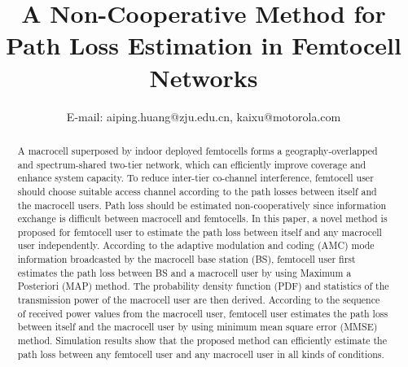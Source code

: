 \documentclass[conference]{IEEEtran}
\begin{document}
\title{A Non-Cooperative Method for Path Loss Estimation in Femtocell Networks}


\author{

 
E-mail: aiping.huang@zju.edu.cn, kaixu@motorola.com}












\maketitle


\begin{abstract}
A macrocell superposed by indoor deployed femtocells forms a
geography-overlapped and spectrum-shared two-tier network, which can
efficiently improve coverage and enhance system capacity. To reduce
inter-tier co-channel interference, femtocell user should choose
suitable access channel according to the path losses between itself
and the macrocell users. Path loss should be estimated
non-cooperatively since information exchange is difficult between
macrocell and femtocells. In this paper, a novel method is proposed
for femtocell user to estimate the path loss between itself and any
macrocell user independently. According to the adaptive modulation
and coding (AMC) mode information broadcasted by the macrocell base
station (BS), femtocell user first estimates the path loss between
BS and a macrocell user by using Maximum a Posteriori (MAP) method.
The probability density function (PDF) and statistics of the
transmission power of the macrocell user are then derived. According
to the sequence of received power values from the macrocell user,
femtocell user estimates the path loss between itself and the
macrocell user by using minimum mean square error (MMSE) method.
Simulation results show that the proposed method can efficiently
estimate the path loss between any femtocell user and any macrocell
user in all kinds of conditions.
\end{abstract}
\end{document}
